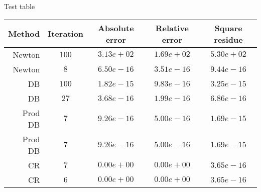 \documentclass{beamer}
\theoremstyle{plain}
\theoremstyle{definition}
\theoremstyle{remark}
\begin{document}
\begin{frame}{Test table}
  \begin{tabular}{r| c c c c}
    Method & Iteration & Absolute error & Relative error & Square residue \\
    \hline
    Newton & $100$ & $3.13e+02$ & $1.69e+02$ & $5.30e+02$ \\
    Newton & $8$ & $6.50e-16$ & $3.51e-16$ & $9.44e-16$ \\
    \hline
    DB & $100$ & $1.82e-15$ & $9.83e-16$ & $3.25e-15$ \\
    DB & $27$ & $3.68e-16$ & $1.99e-16$ & $6.86e-16$ \\
    \hline
    Prod DB & $7$ & $9.26e-16$ & $5.00e-16$ & $1.69e-15$ \\
    Prod DB & $7$ & $9.26e-16$ & $5.00e-16$ & $1.69e-15$ \\
    \hline
    CR & $7$ & $0.00e+00$ & $0.00e+00$ & $3.65e-16$ \\
    CR & $6$ & $0.00e+00$ & $0.00e+00$ & $3.65e-16$ \\
  \end{tabular}

\end{frame}
\end{document}
